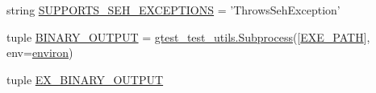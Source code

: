 \begin{DoxyCompactItemize}
string \hyperlink{namespacegtest__catch__exceptions__test_a237f68d721da53e9fd4f83b07a1887e3}{S\-U\-P\-P\-O\-R\-T\-S\-\_\-\-S\-E\-H\-\_\-\-E\-X\-C\-E\-P\-T\-I\-O\-N\-S} = 'Throws\-Seh\-Exception'
\item 
tuple \hyperlink{namespacegtest__catch__exceptions__test_a0116f4bc5b12d5f2edf7f0aa5ebdd121}{B\-I\-N\-A\-R\-Y\-\_\-\-O\-U\-T\-P\-U\-T} = \hyperlink{classgtest__test__utils_1_1_subprocess}{gtest\-\_\-test\-\_\-utils.\-Subprocess}(\mbox{[}\hyperlink{namespacegtest__catch__exceptions__test_a9176972ff83182f11532cbbc27f5cb42}{E\-X\-E\-\_\-\-P\-A\-T\-H}\mbox{]}, env=\hyperlink{namespacegtest__catch__exceptions__test_ae51b794c28e667016c180f1b3fc85292}{environ})
\item 
tuple \hyperlink{namespacegtest__catch__exceptions__test_a890b7d8de84d44cf4cd776663654489a}{E\-X\-\_\-\-B\-I\-N\-A\-R\-Y\-\_\-\-O\-U\-T\-P\-U\-T}
\end{DoxyCompactItemize}


